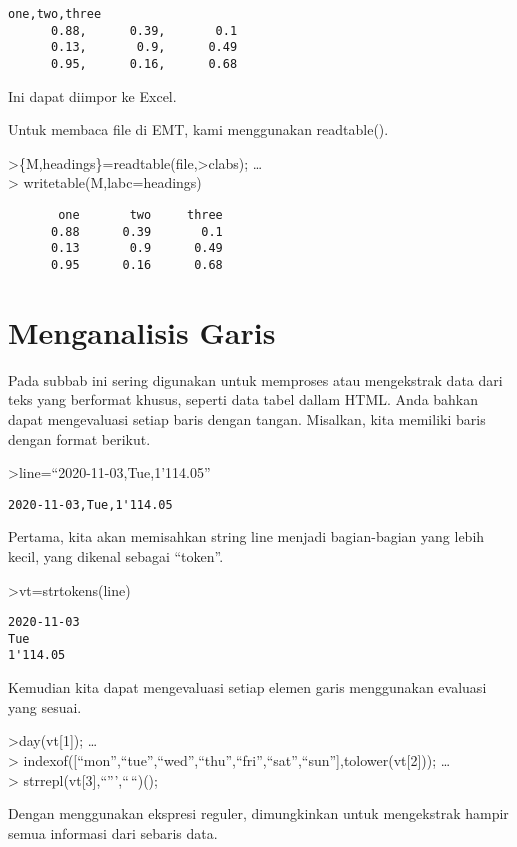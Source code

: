 \documentclass[
]{book}
\begin{document}
\begin{verbatim}
one,two,three
      0.88,      0.39,       0.1
      0.13,       0.9,      0.49
      0.95,      0.16,      0.68
\end{verbatim}

Ini dapat diimpor ke Excel.

Untuk membaca file di EMT, kami menggunakan readtable().

\textgreater\{M,headings\}=readtable(file,\textgreater clabs); \ldots{}\\
\textgreater{} writetable(M,labc=headings)

\begin{verbatim}
       one       two     three
      0.88      0.39       0.1
      0.13       0.9      0.49
      0.95      0.16      0.68
\end{verbatim}

\chapter{Menganalisis Garis}\label{menganalisis-garis}

Pada subbab ini sering digunakan untuk memproses atau mengekstrak data dari teks yang berformat khusus, seperti data tabel dallam HTML. Anda bahkan dapat mengevaluasi setiap baris dengan tangan. Misalkan, kita memiliki baris dengan format berikut.

\textgreater line=``2020-11-03,Tue,1'114.05''

\begin{verbatim}
2020-11-03,Tue,1'114.05
\end{verbatim}

Pertama, kita akan memisahkan string line menjadi bagian-bagian yang lebih kecil, yang dikenal sebagai ``token''.

\textgreater vt=strtokens(line)

\begin{verbatim}
2020-11-03
Tue
1'114.05
\end{verbatim}

Kemudian kita dapat mengevaluasi setiap elemen garis menggunakan evaluasi yang sesuai.

\textgreater day(vt{[}1{]}); \ldots{}\\
\textgreater{} indexof({[}``mon'',``tue'',``wed'',``thu'',``fri'',``sat'',``sun''{]},tolower(vt{[}2{]})); \ldots{}\\
\textgreater{} strrepl(vt{[}3{]},``''',``\,``)();

Dengan menggunakan ekspresi reguler, dimungkinkan untuk mengekstrak hampir semua informasi dari sebaris data.
\end{document}
